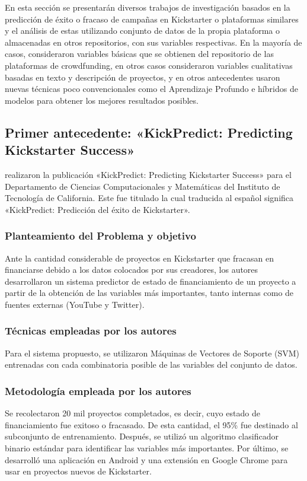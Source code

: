 En esta sección se presentarán diversos trabajos de investigación basados en la predicción de éxito o fracaso de campañas en Kickstarter o plataformas similares y el análisis de estas utilizando conjunto de datos de la propia plataforma o almacenadas en otros repositorios, con sus variables respectivas. En la mayoría de casos, consideraron variables básicas que se obtienen del repositorio de las plataformas de crowdfunding, en otros casos consideraron variables cualitativas basadas en texto y descripción de proyectos, y en otros antecedentes usaron nuevas técnicas poco convencionales como el Aprendizaje Profundo e híbridos de modelos para obtener los mejores resultados posibles.

\subsection{Primer antecedente: «KickPredict: Predicting Kickstarter Success» \citep*{pr_chen2013kickpredict}}
\citeauthor{pr_chen2013kickpredict} realizaron la publicación «KickPredict: Predicting Kickstarter Success» para el Departamento de Ciencias Computacionales y Matemáticas del Instituto de Tecnología de California. Este fue titulado  la cual traducida al español significa «KickPredict: Predicción del éxito de Kickstarter».

\subsubsection{Planteamiento del Problema y objetivo}
Ante la cantidad considerable de proyectos en Kickstarter que fracasan en financiarse debido a los datos colocados por sus creadores, los autores desarrollaron un sistema predictor de estado de financiamiento de un proyecto a partir de la obtención de las variables más importantes, tanto internas como de fuentes externas (YouTube y Twitter).

\subsubsection{Técnicas empleadas por los autores}
Para el sistema propuesto, se utilizaron Máquinas de Vectores de Soporte (SVM) entrenadas con cada combinatoria posible de las variables del conjunto de datos.

\subsubsection{Metodología empleada por los autores}
Se recolectaron 20 mil proyectos completados, es decir, cuyo estado de financiamiento fue exitoso o fracasado. De esta cantidad, el 95\% fue destinado al subconjunto de entrenamiento. Después, se utilizó un algoritmo clasificador binario estándar para identificar las variables más importantes. Por último, se desarrolló una aplicación en Android y una extensión en Google Chrome para usar en proyectos nuevos de Kickstarter.

